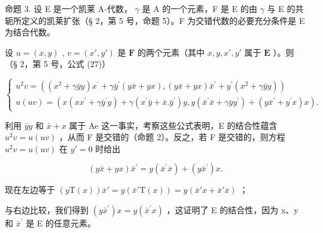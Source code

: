 命题 3. 设 E 是一个凯莱 A-代数， \(\gamma\) 是 A 的一个元素，F 是 E 的由 \(\gamma\) 与 E 的共轭所定义的凯莱扩张（§ 2，第 5 号，命题 5）。F 为交错代数的必要充分条件是 E 为结合代数。

设 \(u = (x, y)\) , \(v = (x', y')\) 是 \(\mathbf{F}\) 的两个元素（其中 \(x, y, x', y'\) 属于 \(\mathbf{E}\) ）。则（§ 2，第 5 号，公式 (27)）

\[
\left\{ \begin{array}{l} u ^ {2} v = ((x ^ {2} + \gamma \bar {y} y) x ^ {\prime} + \gamma \bar {y} ^ {\prime} (y \bar {x} + y x), (y \bar {x} + y x) \bar {x} ^ {\prime} + y ^ {\prime} (x ^ {2} + \gamma \bar {y} y)) \\ u (u v) = (x (x x ^ {\prime} + \gamma \bar {y} ^ {\prime} y) + \gamma (x ^ {\prime} \bar {y} + \bar {x}. \bar {y} ^ {\prime}) y, y (\bar {x} ^ {\prime} \bar {x} + \gamma \bar {y} y ^ {\prime}) + (y \bar {x} ^ {\prime} + y ^ {\prime} x) x). \end{array} \right.\tag{3}
\]

利用 \(\bar{y}y\) 和 \(\bar{x} + x\) 属于 Ae 这一事实，考察这些公式表明，E 的结合性蕴含 \(u^{2}v = u(uv)\) ，从而 F 是交错的（命题 2）。反之，若 F 是交错的，则方程 \(u^{2}v = u(uv)\) 在 \(y' = 0\) 时给出

\[
(y \bar {x} + y x) \bar {x} ^ {\prime} = y (\bar {x} ^ {\prime} \bar {x}) + (y \bar {x} ^ {\prime}) x.
\]

现在左边等于 \((y\mathrm{T}(x))\bar{x}' = y(\bar{x}'\mathrm{T}(x)) = y(\bar{x}'x + \bar{x}'\bar{x})\) ；

与右边比较，我们得到 \((y\bar{x}^{\prime})x = y(\bar{x}^{\prime}x)\) ，这证明了 E 的结合性，因为 x、y 和 \(\bar{x}^{\prime}\) 是 E 的任意元素。

